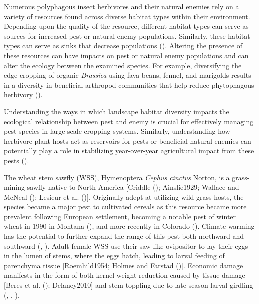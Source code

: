 \documentclass[
]{article}
\begin{document}
Numerous polyphagous insect herbivores and their natural enemies rely on
a variety of resources found across diverse habitat types within their
environment. Depending upon the quality of the resource, different
habitat types can serve as sources for increased pest or natural enemy
populations. Similarly, these habitat types can serve as sinks that
decrease populations (). Altering the presence of these resources can have impacts on
pest or natural enemy populations and can alter the ecology between the
examined species. For example, diversifying the edge cropping of organic
\emph{Brassica} using fava beans, fennel, and marigolds results in a
diversity in beneficial arthropod communities that help reduce
phytophagous herbivory ().

Understanding the ways in which landscape habitat diversity impacts the
ecological relationship between pest and enemy is crucial for
effectively managing pest species in large scale cropping systems.
Similarly, understanding how herbivore plant-hosts act as reservoirs for
pests or beneficial natural enemies can potentially play a role in
stabilizing year-over-year agricultural impact from these pests
().

The wheat stem sawfly (WSS), Hymenoptera \emph{Cephus cinctus} Norton,
is a grass-mining sawfly native to North America {[}Criddle
(); Ainslie1929; Wallace and McNeal
(); Lesieur et al.
(){]}. Originally adept at utilizing
wild grass hosts, the species became a major pest to cultivated cereals
as this resource became more prevalent following European settlement,
becoming a notable pest of winter wheat in 1990 in Montana
(), and more
recently in Colorado (). Climate warming has the potential to further expand the range of
this pest both northward and southward (, ). Adult female WSS
use their saw-like ovipositor to lay their eggs in the lumen of stems,
where the eggs hatch, leading to larval feeding of parenchyma tissue
{[}Roemhild1954; Holmes and Farstad
(){]}. Economic damage manifests in the
form of both kernel weight reduction caused by tissue damage {[}Beres et
al. (); Delaney2010{]} and stem toppling
due to late-season larval girdling (, ,
).
\end{document}
